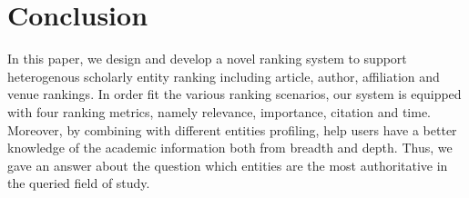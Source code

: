 \section{Conclusion}
\label{sec-conc} 
In this paper, we design and develop a novel ranking system \oursystem to support heterogenous scholarly entity ranking including article, author, affiliation and venue rankings. In order fit the various ranking scenarios, our system is equipped with four ranking metrics, namely relevance, importance, citation and time. Moreover, by combining with different entities profiling, \oursystem help users have a better knowledge of the academic information both from breadth and depth. Thus, we gave an answer about the question which entities are the most authoritative in the queried field of study.



